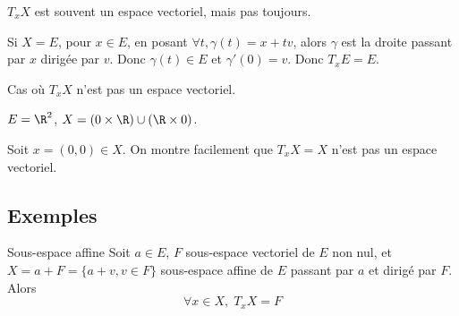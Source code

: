 \begin{remarque}
    $T_xX$ est souvent un espace vectoriel, mais pas toujours.
\end{remarque}

\begin{exemple}
    Si $X = E$, pour $x \in E$, en posant $\forall t, \gamma(t) = x + tv$, alors 
    $\gamma$ est la droite passant par $x$ dirigée par $v$. Donc
    $\gamma(t) \in E$ et $\gamma'(0) = v$. Donc $T_xE = E$.
\end{exemple}

\begin{exemple}
    Cas où $T_xX$ n'est pas un espace vectoriel.

    $E = \R^2$, $X = (0 \times \R) \cup (\R \times 0)$.

    Soit $x = (0, 0) \in X$. On montre facilement que $T_xX = X$ n'est 
    pas un espace vectoriel.
\end{exemple}

\subsection{Exemples}

\begin{proposition}{Sous-espace affine}{}
    Soit $a \in E$, $F$ sous-espace vectoriel de $E$ non nul, et 
    $X = a + F = \{a + v, v \in F\}$ sous-espace affine de $E$ passant par $a$ 
    et dirigé par $F$.
    Alors $$\forall x \in X, \; T_xX = F$$
\end{proposition}


